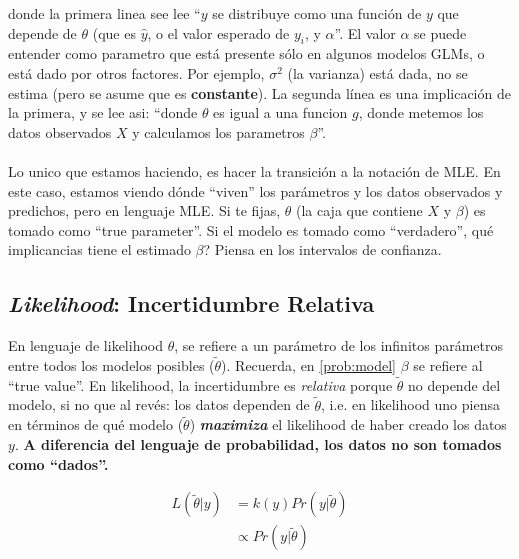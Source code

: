 \documentclass[10pt]{article}
\begin{document}
donde la primera linea see lee ``$y$ se distribuye como una funci\'on de $y$ que depende de $\theta$ (que es $\hat{y}$, o el valor esperado de $y_{i}$, y $\alpha$''. El valor $\alpha$ se puede entender como parametro que est\'a presente s\'olo en algunos modelos GLMs, o est\'a dado por otros factores. Por ejemplo, $\sigma^{2}$ (la varianza) est\'a dada, no se estima (pero se asume que es {\bf constante}). La segunda l\'inea es una implicaci\'on de la primera, y se lee asi: ``donde $\theta$ es igual a una funcion $g$, donde metemos los datos observados $X$ y calculamos los parametros $\beta$''.

\paragraph{} Lo unico que estamos haciendo, es hacer la transici\'on a la notaci\'on de MLE. En este caso, estamos viendo d\'onde ``viven'' los par\'ametros y los datos observados y predichos, pero en lenguaje MLE. Si te fijas, $\theta$ (la caja que contiene $X$ y $\beta$) es tomado como ``true parameter''. {\color{red}Si el modelo es tomado como ``verdadero'', qu\'e implicancias tiene el estimado $\beta$? Piensa en los intervalos de confianza}.

\subsection*{\emph{Likelihood}: Incertidumbre Relativa}

En lenguaje de likelihood $\theta$, se refiere a un par\'ametro de los infinitos par\'ametros entre todos los modelos posibles ($\tilde{\theta}$). Recuerda, en \autoref{prob:model} $\beta$ se refiere al ``true value''. En likelihood, la incertidumbre es \emph{relativa} porque $\tilde{\theta}$ no depende del modelo, si no que al rev\'es: los datos dependen de $\tilde{\theta}$, i.e. en likelihood uno piensa en t\'erminos de qu\'e modelo ($\tilde{\theta}$) \emph{{\bf maximiza}} el likelihood de haber creado los datos $y$. {\bf A diferencia del lenguaje de probabilidad, los datos no son tomados como ``dados''.}


 


\begin{equation} \label{lik:model}
\begin{split}
L(\tilde{\theta}|y) & =  k(y)Pr(y|\tilde{\theta})\\
& \propto Pr(y|\tilde{\theta})
\end{split}
\end{equation}
\end{document}
